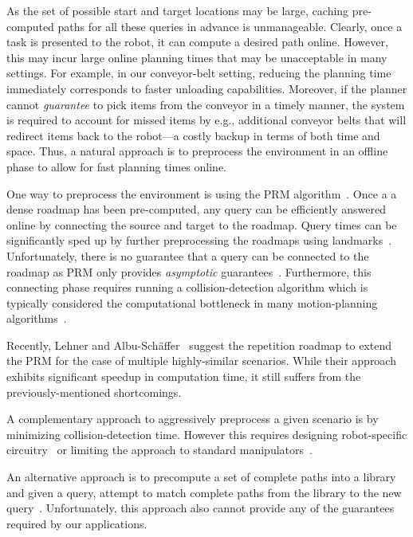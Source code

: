 \documentclass[letterpaper, 10 pt, conference]{ieeeconf}  %
\begin{document}
As the set of possible start and target locations may be large, caching pre-computed paths for all these queries in advance is unmanageable. 
Clearly, once a task is presented to the robot, it can compute a desired path online.
However, this may incur large online planning times that may be unacceptable in many settings.
For example, in our conveyor-belt setting, reducing the planning time immediately corresponds to faster unloading capabilities. 
Moreover, if the planner cannot \emph{guarantee} to pick items from the conveyor in a timely manner, the system is required to account for missed items by e.g., additional conveyor belts that will redirect items back to the robot---a costly backup in terms of both time and space.
Thus, a natural approach is to preprocess the environment in an offline phase to allow for fast planning times online.

One way to preprocess the environment is using the \textsf{PRM} algorithm~\cite{kavraki1996probabilistic}.
Once a a dense roadmap has been pre-computed, any query can be efficiently answered online by connecting the source and target to the roadmap. 
Query times can be significantly sped up by further preprocessing the roadmaps using landmarks~\cite{paden2017landmark}.
Unfortunately, there is no guarantee that a query can be connected to the roadmap as \textsf{PRM} only provides \emph{asymptotic} guarantees~\cite{KKL98}.
Furthermore, this connecting phase requires running a collision-detection algorithm which is typically considered the computational bottleneck in many motion-planning algorithms~\cite{L06}.

Recently, Lehner and  Albu{-}Sch{\"{a}}ffer~\cite{LA18} suggest the repetition roadmap to extend the \textsf{PRM} for the case of multiple highly-similar scenarios.
While their approach exhibits significant speedup in computation time, it still suffers from the previously-mentioned shortcomings.

A complementary approach to aggressively preprocess a given scenario is by minimizing collision-detection time.
However this requires designing robot-specific
circuitry~\cite{MFQSK16}
or limiting the approach to standard manipulators~\cite{YMILV18}.

An alternative approach is to precompute a set of complete paths into a library and given a query, attempt to match complete paths
from the library to the new query~\cite{berenson2012robot, jetchev2013fast}.
Unfortunately, this approach also cannot provide any of the guarantees required by our applications.
\end{document}
